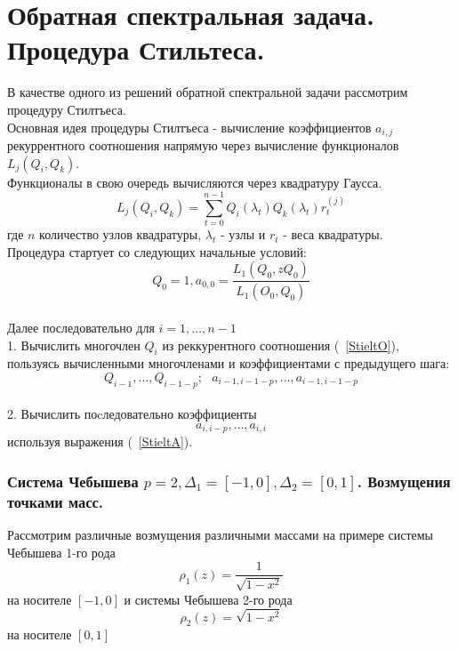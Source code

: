 \documentclass[12pt, a4paper]{report}
\begin{document}
\chapter {Обратная спектральная задача. Процедура Стильтеса.}
В качестве одного из решений
обратной спектральной задачи рассмотрим процедуру
Стилтъеса. \\
Основная идея процедуры Стилтъеса - вычисление коэффициентов $a_{i,j}$ рекуррентного соотношения напрямую через вычисление функционалов $L_j(Q_i,Q_k)$. \\
Функционалы в свою очередь вычисляются через квадратуру Гаусса.
\begin{equation}
L_j(Q_i,Q_k)=\sum\limits_{t=0}^{n-1}{Q_i(\lambda_{t})Q_k(\lambda_{t})r_{t}^{(j)}}
\end{equation}
где $n$ количество узлов квадратуры, $\lambda_t$ - узлы и $r_{t}$
- веса квадратуры.\\
Процедура стартует со следующих начальные условий:
$$Q_0=1, a_{0,0}=\frac{\displaystyle{L_1(Q_0,zQ_0)}}{\displaystyle{L_1(O_0,Q_0)}}$$ \\
Далее последовательно для $i=1,\ldots,n-1$ \\
1. Вычислить многочлен $Q_i$ из реккурентного соотношения (~\ref{StieltO}), пользуясь вычисленными многочленами и коэффициентами с предыдущего шага: 
$$Q_{i-1}, \ldots, Q_{i-1-p}; \mbox{    } a_{i-1,i-1-p}, \ldots,a_{i-1, i-1-p}$$  \\ 
2. Вычислить поcледовательно коэффициенты 
$$a_{i,i-p}, \ldots, a_{i,i}$$ используя выражения (~\ref{StieltA}).\\
\newpage
\subsection {Система Чебышева $p=2, \Delta_1=[-1,0], \Delta_2=[0,1]$. Возмущения точками масс.}
Рассмотрим различные возмущения различными массами на примере 
системы Чебышева 1-го рода $$\rho_1(z)=\displaystyle\frac{1}{\sqrt{1-x^2}}$$ на носителе $[-1,0]$ и системы Чебышева 2-го рода $$\rho_2(z)=\sqrt{1-x^2}$$ на носителе $[0,1]$ \\
\end{document}
